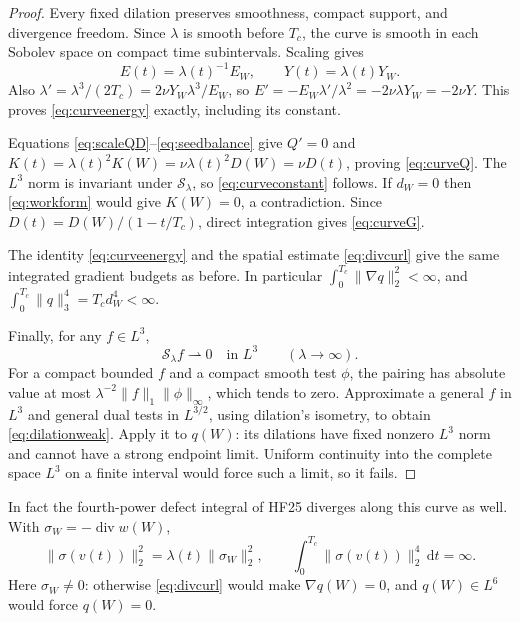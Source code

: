 \documentclass[11pt,a4paper]{article}
\theoremstyle{definition}\newtheorem{definition}[theorem]{Definition}
\theoremstyle{remark}\newtheorem{remark}[theorem]{Remark}
\newcommand{\dd}{\,\mathrm d}
\newcommand{\norm}[1]{\lVert #1\rVert}
\newcommand{\diver}{\operatorname{div}}
\numberwithin{equation}{section}
\begin{document}
\begin{proof}
Every fixed dilation preserves smoothness, compact support, and divergence freedom. Since $\lambda$ is smooth before $T_c$, the curve is smooth in each Sobolev space on compact time subintervals. Scaling gives
\[
 E(t)=\lambda(t)^{-1}E_W,\qquad Y(t)=\lambda(t)Y_W.
\]
Also $\lambda'=\lambda^3/(2T_c)=2\nu Y_W\lambda^3/E_W$, so
$E'=-E_W\lambda'/\lambda^2=-2\nu\lambda Y_W=-2\nu Y$.
This proves \eqref{eq:curveenergy} exactly, including its constant.

Equations \eqref{eq:scaleQD}--\eqref{eq:seedbalance} give $Q'=0$ and
$K(t)=\lambda(t)^2K(W)=\nu\lambda(t)^2D(W)=\nu D(t)$, proving \eqref{eq:curveQ}. The $L^3$ norm is invariant under $\mathscr S_\lambda$, so \eqref{eq:curveconstant} follows. If $d_W=0$ then \eqref{eq:workform} would give $K(W)=0$, a contradiction. Since $D(t)=D(W)/(1-t/T_c)$, direct integration gives \eqref{eq:curveG}.

The identity \eqref{eq:curveenergy} and the spatial estimate \eqref{eq:divcurl} give the same integrated gradient budgets as before. In particular $\int_0^{T_c}\norm{\nabla q}^2_2<\infty$, and $\int_0^{T_c}\norm q_3^4=T_cd_W^4<\infty$.

Finally, for any $f\in L^3$,
\begin{equation}\label{eq:dilationweak}
 \mathscr S_\lambda f\rightharpoonup0\quad\text{in }L^3
 \qquad(\lambda\to\infty).
\end{equation}
For a compact bounded $f$ and a compact smooth test $\phi$, the pairing has absolute value at most
$\lambda^{-2}\norm f_1\norm\phi_\infty$, which tends to zero. Approximate a general $f$ in $L^3$ and general dual tests in $L^{3/2}$, using dilation's isometry, to obtain \eqref{eq:dilationweak}. Apply it to $q(W)$: its dilations have fixed nonzero $L^3$ norm and cannot have a strong endpoint limit. Uniform continuity into the complete space $L^3$ on a finite interval would force such a limit, so it fails.
\end{proof}

In fact the fourth-power defect integral of HF25 diverges along this curve as well. With $\sigma_W=-\diver w(W)$,
\[
 \norm{\sigma(v(t))}_2^2=\lambda(t)\norm{\sigma_W}_2^2,
 \qquad \int_0^{T_c}\norm{\sigma(v(t))}_2^4\dd t=\infty.
\]
Here $\sigma_W\ne0$: otherwise \eqref{eq:divcurl} would make $\nabla q(W)=0$, and $q(W)\in L^6$ would force $q(W)=0$.
\end{document}
